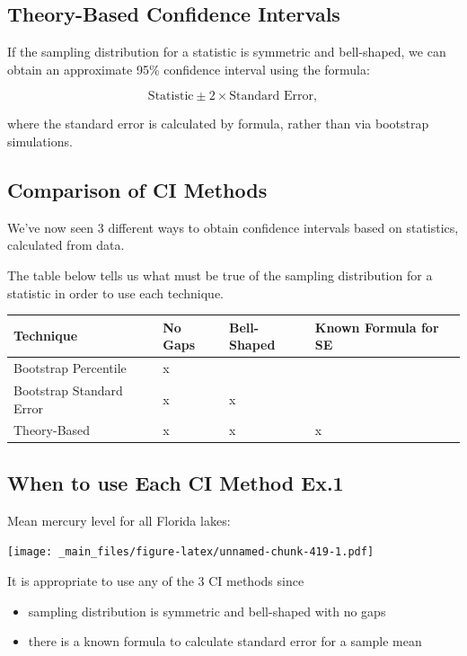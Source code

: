 \documentclass[]{book}
\providecommand{\tightlist}{%
  \setlength{\itemsep}{0pt}\setlength{\parskip}{0pt}}
\begin{document}
\subsection{Theory-Based Confidence
Intervals}\label{theory-based-confidence-intervals}

If the sampling distribution for a statistic is symmetric and
bell-shaped, we can obtain an approximate 95\% confidence interval using
the formula:

\[
\text{Statistic} \pm 2\times{\text{Standard Error}},
\]

where the standard error is calculated by formula, rather than via
bootstrap simulations.

\subsection{Comparison of CI Methods}\label{comparison-of-ci-methods}

We've now seen 3 different ways to obtain confidence intervals based on
statistics, calculated from data.

The table below tells us what must be true of the sampling distribution
for a statistic in order to use each technique.

\begin{longtable}[]{@{}llll@{}}
\toprule
Technique & No Gaps & Bell-Shaped & Known Formula for SE\tabularnewline
\midrule
\endhead
Bootstrap Percentile & x & &\tabularnewline
Bootstrap Standard Error & x & x &\tabularnewline
Theory-Based & x & x & x\tabularnewline
\bottomrule
\end{longtable}

\subsection{When to use Each CI Method
Ex.1}\label{when-to-use-each-ci-method-ex.1}

Mean mercury level for all Florida lakes:

\texttt{[image: \_main\_files/figure-latex/unnamed-chunk-419-1.pdf]}

It is appropriate to use any of the 3 CI methods since

\begin{itemize}
\tightlist
\item
  sampling distribution is symmetric and bell-shaped with no gaps\\
\item
  there is a known formula to calculate standard error for a sample mean
\end{itemize}
\end{document}
